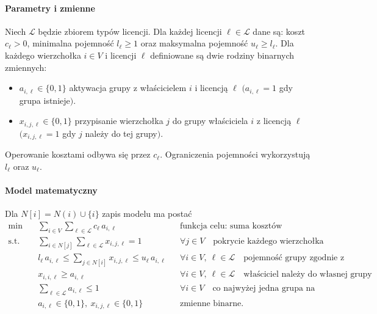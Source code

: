 \paragraph{Parametry i zmienne}
Niech \(\mathcal{L}\) będzie zbiorem typów licencji. Dla każdej licencji \(\ell\in\mathcal{L}\) dane są: koszt \(c_\ell>0\), minimalna pojemność \(l_\ell\ge 1\) oraz maksymalna pojemność \(u_\ell\ge l_\ell\). Dla każdego wierzchołka \(i\in V\) i licencji \(\ell\) definiowane są dwie rodziny binarnych zmiennych:
\begin{itemize}
  \item \(a_{i,\ell}\in\{0,1\}\) aktywacja grupy z właścicielem \(i\) i licencją \(\ell\) \((a_{i,\ell}=1\) gdy grupa istnieje\().\)
  \item \(x_{i,j,\ell}\in\{0,1\}\) przypisanie wierzchołka \(j\) do grupy właściciela \(i\) z licencją \(\ell\) \((x_{i,j,\ell}=1\) gdy \(j\) należy do tej grupy\().\)
\end{itemize}
Operowanie kosztami odbywa się przez \(c_\ell\). Ograniczenia pojemności wykorzystują \(l_\ell\) oraz \(u_\ell\).

\paragraph{Model matematyczny}
Dla \(N[i]=N(i)\cup\{i\}\) zapis modelu ma postać
\begin{align}
  \min\quad & \sum_{i\in V}\sum_{\ell\in\mathcal{L}} c_\ell\, a_{i,\ell}                    &  & \text{funkcja celu: suma kosztów aktywnych grup}                                    \\[4pt]
  \text{s.t.}\quad
            & \sum_{i\in N[j]}\sum_{\ell\in\mathcal{L}} x_{i,j,\ell} = 1                    &  & \forall j\in V \quad \text{pokrycie każdego wierzchołka dokładnie raz}              \\[2pt]
            & l_\ell\, a_{i,\ell} \le \sum_{j\in N[i]} x_{i,j,\ell} \le u_\ell\, a_{i,\ell} &  & \forall i\in V,\ \ell\in\mathcal{L} \quad \text{pojemność grupy zgodnie z licencją} \\[2pt]
            & x_{i,i,\ell} \ge a_{i,\ell}                                                   &  & \forall i\in V,\ \ell\in\mathcal{L} \quad \text{właściciel należy do własnej grupy} \\[2pt]
            & \sum_{\ell\in\mathcal{L}} a_{i,\ell} \le 1                                    &  & \forall i\in V \quad \text{co najwyżej jedna grupa na właściciela}                  \\[2pt]
            & a_{i,\ell}\in\{0,1\},\ x_{i,j,\ell}\in\{0,1\}                                 &  & \text{zmienne binarne.}
\end{align}


